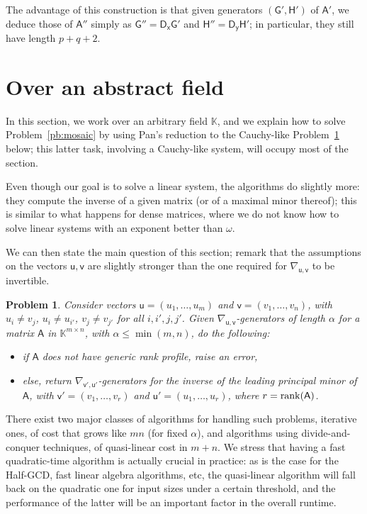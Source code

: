 \documentclass{sig-alternate}
\newcommand{\vu}{\ensuremath{\mathsf{u}}}
\newcommand{\vv}{\ensuremath{\mathsf{v}}}
\newcommand{\vx}{\ensuremath{\mathsf{x}}}
\newcommand{\vy}{\ensuremath{\mathsf{y}}}
\newcommand{\mA}{\ensuremath{\mathsf{A}}}
\newcommand{\mD}{\ensuremath{\mathsf{D}}}
\newcommand{\mG}{\ensuremath{\mathsf{G}}}
\newcommand{\mH}{\ensuremath{\mathsf{H}}}
\newcommand{\K}{\ensuremath{\mathbb{K}}}
\newtheorem{pbm}{Problem}
\begin{document}
The advantage of this construction is that given generators
$(\mG',\mH')$ of $\mA'$, we deduce those of $\mA''$ simply as
$\mG''=\mD_\vx \mG'$ and $\mH''=\mD_\vy \mH'$; in particular, they
still have length $p+q+2$.


\section{Over an abstract field}

In this section, we work over an arbitrary field $\K$, and we explain
how to solve Problem~\ref{pb:mosaic} by using Pan's reduction to the
Cauchy-like Problem~\ref{pb:cauchy} below; this latter task, involving
a Cauchy-like system, will occupy most of the section.

Even though our goal is to solve a linear system, the algorithms do
slightly more: they compute the inverse of a given matrix (or of a
maximal minor thereof); this is similar to what happens for dense
matrices, where we do not know how to solve linear systems with an
exponent better than $\omega$.

We can then state the main question of this section; remark that the
assumptions on the vectors $\vu,\vv$ are slightly stronger than the one
required for $\nabla_{\vu,\vv}$ to be invertible.
\begin{pbm}\label{pb:cauchy}
  Consider vectors $\vu=(u_1,\dots,u_m)$ and $\vv=(v_1,\dots,v_n)$, with
  $u_i \ne v_j$, $u_i \ne u_{i'}$, $v_j \ne v_{j'}$ for all
  $i,i',j,j'$.  Given $\nabla_{\vu,\vv}$-generators of length $\alpha$ for
  a matrix $\mA$ in $\K^{m \times n}$, with $\alpha \le \min(m,n)$, do
  the following:
  \begin{itemize}
  \item if $\mA$ does not have generic rank profile, raise an error,
  \item else, return $\nabla_{\vv',\vu'}$-generators for the inverse of the
    leading principal minor of $\mA$, with $\vv'=(v_1,\dots,v_r)$ and
    $\vu'=(u_1,\dots,u_r)$, where $r={\rm rank}(\mA)$.
\end{itemize}
\end{pbm}
There exist two major classes of algorithms for handling such
problems, iterative ones, of cost that grows like $mn$ (for fixed
$\alpha$), and algorithms using divide-and-conquer techniques, of
quasi-linear cost in $m+n$. We stress that having a fast
quadratic-time algorithm is actually crucial in practice: as is the
case for the Half-GCD, fast linear algebra algorithms, etc, the
quasi-linear algorithm will fall back on the quadratic one for input
sizes under a certain threshold, and the performance of the latter
will be an important factor in the overall runtime.
\end{document}
